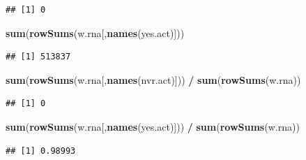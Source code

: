\documentclass[]{article}
\newenvironment{Shaded}{\begin{snugshade}}{\end{snugshade}}
\newcommand{\CommentTok}[1]{\textcolor[rgb]{0.56,0.35,0.01}{\textit{#1}}}
\newcommand{\KeywordTok}[1]{\textcolor[rgb]{0.13,0.29,0.53}{\textbf{#1}}}
\newcommand{\NormalTok}[1]{#1}
\newcommand{\OperatorTok}[1]{\textcolor[rgb]{0.81,0.36,0.00}{\textbf{#1}}}
\newcommand{\StringTok}[1]{\textcolor[rgb]{0.31,0.60,0.02}{#1}}
\begin{document}
\begin{verbatim}
## [1] 0
\end{verbatim}

\begin{Shaded}
\begin{Highlighting}[]
\KeywordTok{sum}\NormalTok{(}\KeywordTok{rowSums}\NormalTok{(w.rna[,}\KeywordTok{names}\NormalTok{(yes.act)]))}
\end{Highlighting}
\end{Shaded}

\begin{verbatim}
## [1] 513837
\end{verbatim}

\begin{Shaded}
\begin{Highlighting}[]
\KeywordTok{sum}\NormalTok{(}\KeywordTok{rowSums}\NormalTok{(w.rna[,}\KeywordTok{names}\NormalTok{(nvr.act)])) }\OperatorTok{/}\StringTok{ }\KeywordTok{sum}\NormalTok{(}\KeywordTok{rowSums}\NormalTok{(w.rna))}
\end{Highlighting}
\end{Shaded}

\begin{verbatim}
## [1] 0
\end{verbatim}

\begin{Shaded}
\begin{Highlighting}[]
\KeywordTok{sum}\NormalTok{(}\KeywordTok{rowSums}\NormalTok{(w.rna[,}\KeywordTok{names}\NormalTok{(yes.act)])) }\OperatorTok{/}\StringTok{ }\KeywordTok{sum}\NormalTok{(}\KeywordTok{rowSums}\NormalTok{(w.rna))}
\end{Highlighting}
\end{Shaded}

\begin{verbatim}
## [1] 0.98993
\end{verbatim}

\begin{Shaded}
\end{Shaded}
\end{document}
